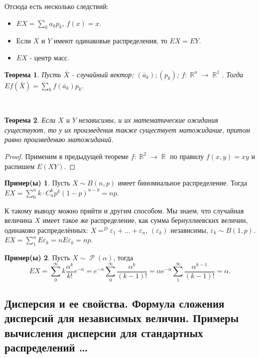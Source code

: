 \documentclass[a4paper,100pt]{article}
\theoremstyle{indented}
\newtheorem{theorem}{Теорема}
\theoremstyle{definition}
\newtheorem{exl}{Пример(ы)}
\theoremstyle{remark}
\DeclareMathOperator{\RR}{\mathbb{R}}
\DeclareMathOperator{\Rho}{\mathcal{P}}
\begin{document}
Отсюда есть несколько следствий:

\begin{itemize}
    \item $EX=\sum_k a_k p_k$, $f(x)=x$. 
    \item Если $X$ и $Y$ имеют одинаковые распределения, то $EX=EY$. 
    \item $EX$ - центр масс.
\end{itemize}

\begin{theorem}
    Пусть $\bar{X}$ - случайный вектор; $(\bar{a}_k); (p_k)$; $f:\RR^n \rightarrow \RR^1$. Тогда $Ef(\bar{X}) = \sum_k f(\bar{a}_k)p_k$. 
\end{theorem} \

\begin{theorem}
    Если $X$ и $Y$ независимы, и их математические ожидания существуют, то у их произведения также существует матожидание, притом равно произведению матожиданий.
\end{theorem}

\begin{proof}
    Применим в предыдущей теореме $f: \RR^2 \rightarrow \RR$ по правилу $f(x, y)=xy$ и распишем $E(XY)$. 
\end{proof}

\begin{exl}
  Пусть $X \sim B(n, p)$ имеет биномиальное распределение. Тогда $EX=\sum_0^n k\cdot C_n^kp^k(1-p)^{n-k}=np$. \ 

  К такому выводу можно прийти и другим способом. Мы знаем, что случайная величина $X$ имеет такое же распределение, как сумма бернуллиевских величин, одинаково распределённых: $X=^D\varepsilon_1+\ldots+\varepsilon_n$, $(\varepsilon_k)$ независимы, $\varepsilon_k\sim B(1, p)$. $EX=\sum_1^n E\varepsilon_k=n E\varepsilon_k = np$. 
\end{exl}

\begin{exl}
  Пусть $X\sim \Rho(\alpha)$, тогда 
  \[
      EX = \sum_0^\infty k\frac{\alpha^k}{k!}e^{-\alpha} = e^{-\alpha}\sum_0^\infty \frac{\alpha^k}{(k-1)!} = \alpha e^{-\alpha}\sum_1^\infty \frac{\alpha^{k-1}}{(k-1)!}=\alpha.
  \] 
\end{exl}

\subsection{Дисперсия и ее свойства. Формула сложения дисперсий для независимых величин. Примеры вычисления дисперсии для стандартных распределений \ldots} 
\end{document}
